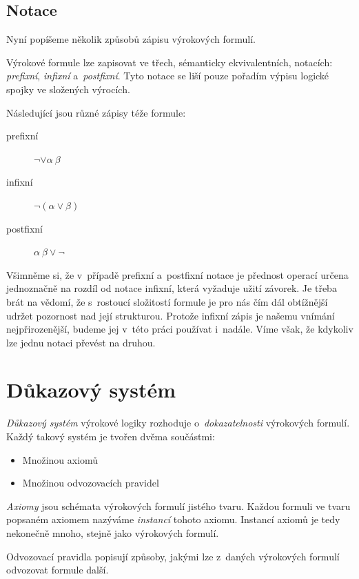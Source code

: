 \documentclass[thesis=B,czech,hidelinks]{thesis}[2012/06/26]
\begin{document}
\subsection{Notace}

Nyní popíšeme několik způsobů zápisu výrokových formulí.

Výrokové formule lze zapisovat ve třech, sémanticky ekvivalentních, notacích: \emph{prefixní}, \emph{infixní} a~\emph{postfixní}. Tyto notace se liší pouze pořadím výpisu logické spojky ve složených výrocích.

\begin{exm}
Následující jsou různé zápisy téže formule:
\begin{description}
	\item[prefixní] $\neg \vee \alpha \: \beta$
	\item[infixní] $\neg (\alpha \vee \beta)$
	\item[postfixní] $\alpha \: \beta \vee \neg$
\end{description}
\end{exm}

Všimněme si, že v~případě prefixní a~postfixní notace je přednost operací určena jednoznačně na rozdíl od notace infixní, která vyžaduje užití závorek. Je třeba brát na vědomí, že s~rostoucí složitostí formule je pro nás čím dál obtížnější udržet pozornost nad její strukturou. Protože infixní zápis je našemu vnímání nejpřirozenější, budeme jej v~této práci používat i~nadále. Víme však, že kdykoliv lze jednu notaci převést na druhou.

\section{Důkazový systém}

\emph{Důkazový systém} výrokové logiky rozhoduje o~\emph{dokazatelnosti} výrokových formulí. Každý takový systém je tvořen dvěma součástmi:

\begin{itemize}
	\item Množinou axiomů
	\item Množinou odvozovacích pravidel
\end{itemize}

\emph{Axiomy} jsou schémata výrokových formulí jistého tvaru. Každou formuli ve tvaru popsaném axiomem nazýváme \emph{instancí} tohoto axiomu. Instancí axiomů je tedy nekonečně mnoho, stejně jako výrokových formulí.

Odvozovací pravidla popisují způsoby, jakými lze z~daných výrokových formulí odvozovat formule další.
\end{document}
